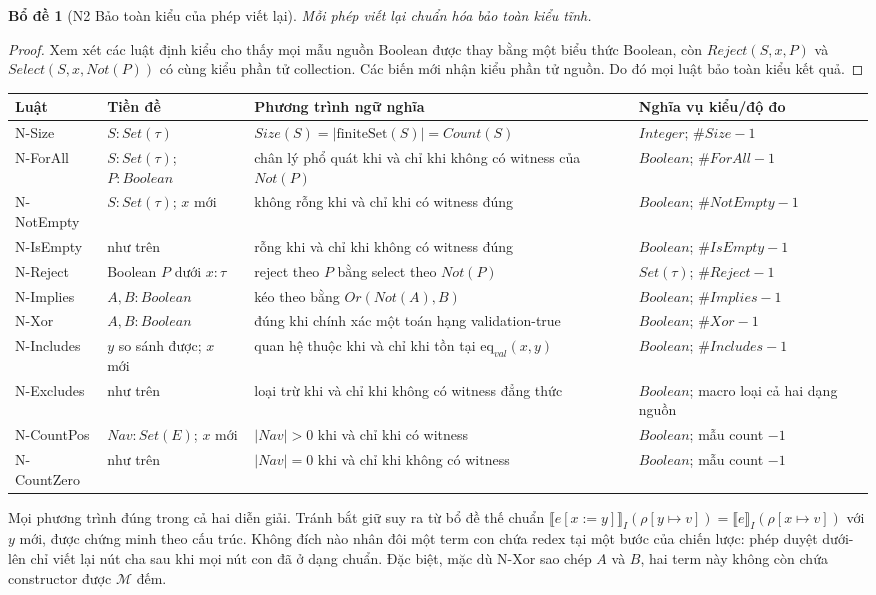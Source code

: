 \documentclass[11pt,a4paper]{article}
\newtheorem{lemma}{Bổ đề}
\theoremstyle{definition}
\newcommand{\finiteSet}{\mathrm{finiteSet}}
\newcommand{\eqval}{\mathrm{eq}_{val}}
\newcommand{\sem}[2]{\llbracket #1 \rrbracket_{#2}}
\begin{document}
\begin{lemma}[N2 Bảo toàn kiểu của phép viết lại]
Mỗi phép viết lại chuẩn hóa bảo toàn kiểu tĩnh.
\end{lemma}
\begin{proof}
Xem xét các luật định kiểu cho thấy mọi mẫu nguồn Boolean được thay bằng một
biểu thức Boolean, còn $Reject(S,x,P)$ và $Select(S,x,Not(P))$ có cùng kiểu
phần tử collection. Các biến mới nhận kiểu phần tử nguồn. Do đó mọi luật bảo
toàn kiểu kết quả.
\end{proof}

\begin{longtable}{p{}p{}p{}p{}}
\toprule
Luật & Tiền đề & Phương trình ngữ nghĩa & Nghĩa vụ kiểu/độ đo\\
\midrule
N-Size & $S:Set(\tau)$ & $Size(S)=|\finiteSet(S)|=Count(S)$ & $Integer$; $\#Size-1$\\
N-ForAll & $S:Set(\tau)$; $P:Boolean$ & chân lý phổ quát khi và chỉ khi không có witness của $Not(P)$ & $Boolean$; $\#ForAll-1$\\
N-NotEmpty & $S:Set(\tau)$; $x$ mới & không rỗng khi và chỉ khi có witness đúng & $Boolean$; $\#NotEmpty-1$\\
N-IsEmpty & như trên & rỗng khi và chỉ khi không có witness đúng & $Boolean$; $\#IsEmpty-1$\\
N-Reject & Boolean $P$ dưới $x:\tau$ & reject theo $P$ bằng select theo $Not(P)$ & $Set(\tau)$; $\#Reject-1$\\
N-Implies & $A,B:Boolean$ & kéo theo bằng $Or(Not(A),B)$ & $Boolean$; $\#Implies-1$\\
N-Xor & $A,B:Boolean$ & đúng khi chính xác một toán hạng validation-true & $Boolean$; $\#Xor-1$\\
N-Includes & $y$ so sánh được; $x$ mới & quan hệ thuộc khi và chỉ khi tồn tại $\eqval(x,y)$ & $Boolean$; $\#Includes-1$\\
N-Excludes & như trên & loại trừ khi và chỉ khi không có witness đẳng thức & $Boolean$; macro loại cả hai dạng nguồn\\
N-CountPos & $Nav:Set(E)$; $x$ mới & $|Nav|>0$ khi và chỉ khi có witness & $Boolean$; mẫu count $-1$\\
N-CountZero & như trên & $|Nav|=0$ khi và chỉ khi không có witness & $Boolean$; mẫu count $-1$\\
\bottomrule
\end{longtable}

Mọi phương trình đúng trong cả hai diễn giải. Tránh bắt giữ suy ra từ bổ đề thế
chuẩn
$\sem{e[x:=y]}{I}(\rho[y\mapsto v])=\sem{e}{I}(\rho[x\mapsto v])$ với $y$ mới,
được chứng minh theo cấu trúc. Không đích nào nhân đôi một term con
chứa redex tại một bước của chiến lược: phép duyệt dưới-lên chỉ viết lại nút
cha sau khi mọi nút con đã ở dạng chuẩn. Đặc biệt, mặc dù N-Xor sao chép $A$ và
$B$, hai term này không còn chứa constructor được $\mathcal M$ đếm.
\end{document}
